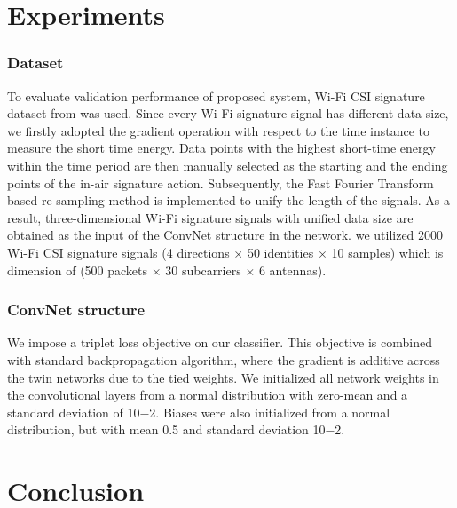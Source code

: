\documentclass[runningheads]{llncs}
\begin{document}
\section{Experiments}

\subsubsection{Dataset}
 To evaluate validation performance of proposed system, Wi-Fi CSI signature dataset from \cite{moon2017air} was used.
 Since every Wi-Fi signature signal has different data size, we firstly adopted the gradient operation with respect to the time instance to measure the short time energy. Data points with the highest short-time energy within the time period are then manually selected as the starting and the ending points of the in-air signature action. Subsequently, the Fast Fourier Transform based re-sampling method \cite{moon2017air} is implemented to unify the length of the signals. As a result, three-dimensional Wi-Fi signature signals with unified data size are obtained as the input of the ConvNet structure in the network.
 we utilized 2000 Wi-Fi CSI signature signals (4 directions $\times$ 50 identities $\times$ 10 samples) which is dimension of (500 packets $\times$ 30 subcarriers $\times$ 6 antennas). 
 


\subsubsection{ConvNet structure}
 We impose a triplet loss objective on our classifier.
This objective is combined with standard backpropagation algorithm, where the gradient is additive across the twin networks due to the tied weights.
 We initialized all network weights in the convolutional layers from a normal distribution with zero-mean and a standard deviation of 10−2. Biases were also initialized from a normal distribution, but with mean 0.5 and standard deviation 10−2.

\section{Conclusion}

%
%
%
%
%
%






\end{document}
